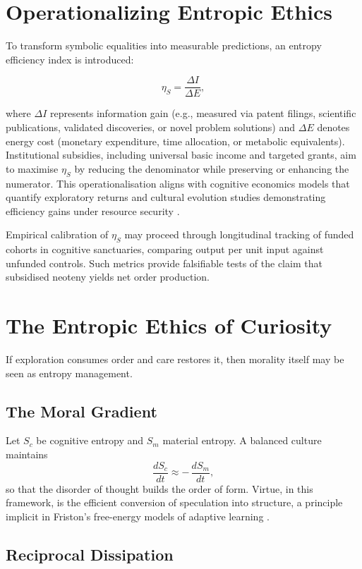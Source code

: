 \documentclass[12pt,a4paper]{article}
\begin{document}
\section{Operationalizing Entropic Ethics}

To transform symbolic equalities into measurable predictions, 
an entropy efficiency index is introduced:

\[
\eta_S = \frac{\Delta I}{\Delta E},
\]

where \(\Delta I\) represents information gain (e.g., measured via patent filings, 
scientific publications, validated discoveries, or novel problem solutions) 
and \(\Delta E\) denotes 
energy cost (monetary expenditure, time allocation, or metabolic equivalents). 
Institutional subsidies, including universal basic income and targeted grants, 
aim to maximise \(\eta_S\) by reducing the denominator while preserving or enhancing 
the numerator. This operationalisation aligns with cognitive economics models 
that quantify exploratory returns \citep{friston2023active} and cultural evolution 
studies demonstrating efficiency gains under resource security \citep{henrich2016cooperation}.

Empirical calibration of \(\eta_S\) may proceed through longitudinal tracking 
of funded cohorts in cognitive sanctuaries, comparing output per unit input 
against unfunded controls. Such metrics provide falsifiable tests of the claim 
that subsidised neoteny yields net order production.

\section{The Entropic Ethics of Curiosity}

If exploration consumes order and care restores it, 
then morality itself may be seen as entropy management.

\subsection{The Moral Gradient}

Let $S_c$ be cognitive entropy and $S_m$ material entropy.  
A balanced culture maintains
\[
\frac{dS_c}{dt} \approx -\,\frac{dS_m}{dt},
\]
so that the disorder of thought builds the order of form.
Virtue, in this framework, is the efficient conversion of speculation into structure,
a principle implicit in Friston’s free-energy models of adaptive learning 
\citep{friston2023active}.

\subsection{Reciprocal Dissipation}
\end{document}
